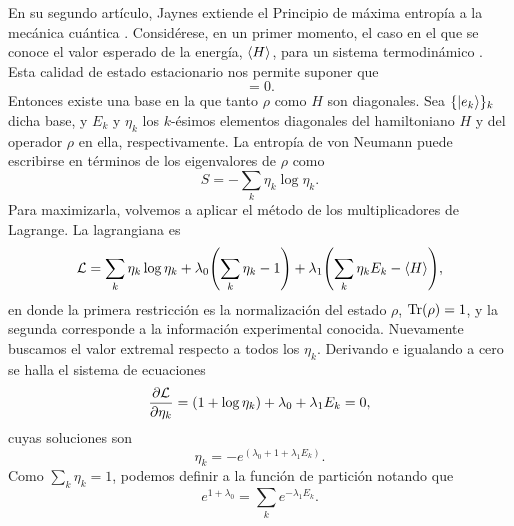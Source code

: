 En su segundo artículo, Jaynes extiende el Principio de máxima entropía a la mecánica cuántica \cite{JaynesII}. Considérese, en un primer momento, el caso en el que se conoce el valor esperado de la energía, $\expval{H}$, para un sistema termodinámico . Esta calidad de estado estacionario nos permite suponer que
\begin{equation}
    [\rho,H]=0.\nonumber
\end{equation}
Entonces existe una base en la que tanto $\rho$ como $H$ son diagonales. Sea $\{\ket{e_{k}}\}_{k}$ dicha base, y $E_{k}$ y $\eta_{k}$ los $k$-ésimos elementos diagonales del hamiltoniano $H$ y del operador $\rho$ en ella, respectivamente. La entropía de von Neumann puede escribirse en términos de los eigenvalores de $\rho$ como
\begin{equation}
    S=-\sum_{k}\eta_{k}\log{\eta_{k}}.\nonumber
\end{equation}
Para maximizarla, volvemos a aplicar el método de los multiplicadores de Lagrange. La lagrangiana es
\begin{equation}
    \mathcal{L}=\sum_{k}\eta_{k}\log{\eta_{k}}+\lambda_{0}\qty(\sum_{k}\eta_{k}-1)+\lambda_{1}\qty(\sum_{k}\eta_{k}E_{k}-\expval{H}),\nonumber
\end{equation}
en donde la primera restricción es la normalización del estado $\rho$, $\Tr(\rho)=1$, y la segunda corresponde a la información experimental conocida. Nuevamente buscamos el valor extremal respecto a todos los $\eta_{k}$. Derivando e igualando a cero se halla el sistema de ecuaciones 
\begin{equation}
    \frac{\partial \mathcal{L}}{\partial \eta_{k}}=(1+\log{\eta_{k}})+\lambda_{0}+\lambda_{1}E_{k}=0,\nonumber
\end{equation}
cuyas soluciones son
\begin{equation}
    \eta_{k}=-e^{(\lambda_{0}+1+\lambda_{1}E_{k})}.\nonumber
\end{equation}
Como $\sum_{k}\eta_{k}=1$, podemos definir a la función de partición notando que
\begin{equation}
    e^{1+\lambda_{0}}=\sum_{k}e^{-\lambda_{1}E_{k}}.\nonumber
\end{equation}
